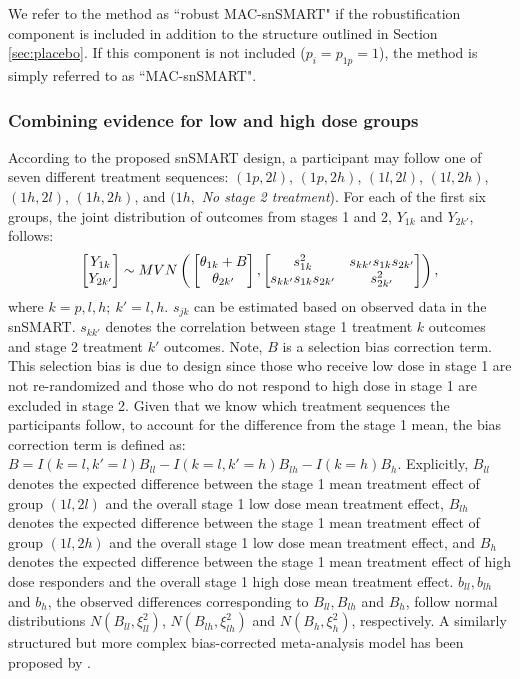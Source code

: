 We refer to the method as ``robust MAC-snSMART" if the robustification component is included in addition to the structure outlined in Section \ref{sec:placebo}. If this component is not included ($p_{i}=p_{1p}=1$), the method is simply referred to as ``MAC-snSMART".

\subsubsection{Combining evidence for low and high dose groups}

According to the proposed \ac{snSMART} design, a participant may follow one of seven different treatment sequences: $(1p, 2l)$, $(1p, 2h)$, $(1l, 2l)$, $(1l, 2h)$, $(1h, 2l)$, $(1h, 2h)$, and $(1h,$ \emph{No stage 2 treatment}). 
For each of the first six groups, the joint distribution of outcomes from stages 1 and 2, $Y_{1k}$ and $Y_{2k'}$, follows:
\begin{equation}\label{eq:joint}
\begin{bmatrix} Y_{1k} \\ Y_{2k'} \end{bmatrix} \sim MVN\left(\\ \begin{bmatrix} \theta_{1k} + B \\ \theta_{2k'}\end{bmatrix}, \begin{bmatrix} s_{1k}^2 & s_{kk'}s_{1k}s_{2k'}\\ s_{kk'}s_{1k}s_{2k'} & s_{2k'}^2\end{bmatrix}\right),
\end{equation}   
where $k = p, l, h; \ k' = l, h$. $s_{jk}$ can be estimated based on observed data in the \ac{snSMART}. $s_{kk'}$ denotes the correlation between stage 1 treatment $k$ outcomes and stage 2 treatment $k'$ outcomes. Note, $B$ is a selection bias correction term. This selection bias is due to design since those who receive low dose in stage 1 are not re-randomized and those who do not respond to high dose in stage 1 are excluded in stage 2. Given that we know which treatment sequences the participants follow, to account for the difference from the stage 1 mean, the bias correction term is defined as: $B = I(k = l, k' = l)B_{ll} - I(k = l, k' = h)B_{lh} - I(k = h)B_{h}$. Explicitly, $B_{ll}$ denotes the expected difference between the stage 1 mean treatment effect of group $(1l, 2l)$ and the overall stage 1 low dose mean treatment effect, $B_{lh}$ denotes the expected difference between the stage 1 mean treatment effect of group $(1l, 2h)$ and the overall stage 1 low dose mean treatment effect, and $B_h$ denotes the expected difference between the stage 1 mean treatment effect of high dose responders and the overall stage 1 high dose mean treatment effect. $b_{ll}, b_{lh}$ and $b_h$, the observed differences corresponding to $B_{ll}, B_{lh}$ and $B_h$, follow normal distributions $N(B_{ll}, \xi_{ll}^2)$, $N(B_{lh}, \xi_{lh}^2)$ and $N(B_h, \xi_{h}^2)$, respectively. A similarly structured but more complex bias-corrected meta-analysis model has been proposed by \cite{verde2021bias}. 

